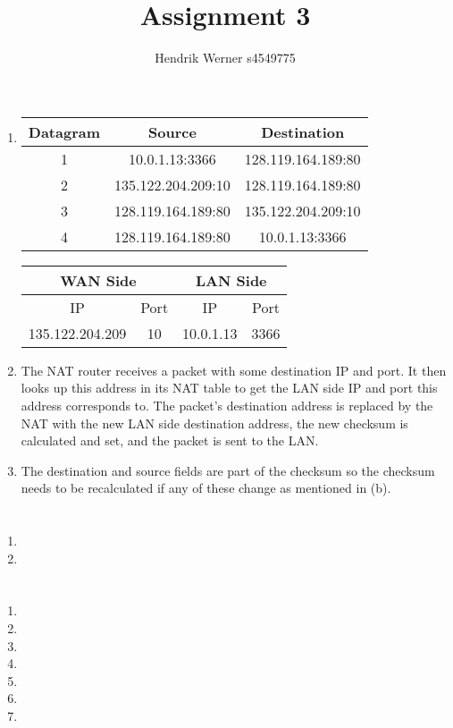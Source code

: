 \documentclass[12pt, a4paper]{article}
\title{Assignment 3}
\author{Hendrik Werner s4549775}
\begin{document}
\maketitle

\section{} %
\begin{enumerate}[a]
	\item %
	\begin{tabular}{|c|c|c|}
		\hline
		Datagram & Source & Destination\\\hline
		1 & 10.0.1.13:3366 & 128.119.164.189:80\\
		2 & 135.122.204.209:10 & 128.119.164.189:80\\
		3 & 128.119.164.189:80 & 135.122.204.209:10\\
		4 & 128.119.164.189:80 & 10.0.1.13:3366\\
		\hline
	\end{tabular}

	\begin{tabular}{|c|c|c|c|}
		\hline
		\multicolumn{2}{|c|}{WAN Side} & \multicolumn{2}{|c|}{LAN Side}\\\hline
		IP & Port & IP & Port\\\hline
		135.122.204.209 & 10 & 10.0.1.13 & 3366\\
		\hline
	\end{tabular}

	\item %
	The NAT router receives a packet with some destination IP and port. It then looks up this address in its NAT table to get the LAN side IP and port this address corresponds to. The packet's destination address is replaced by the NAT with the new LAN side destination address, the new checksum is calculated and set, and the packet is sent to the LAN.

	\item %
	The destination and source fields are part of the checksum so the checksum needs to be recalculated if any of these change as mentioned in (b).

\end{enumerate}

\section{} %
\begin{enumerate}[a]
	\item %
	\item %
\end{enumerate}

\section{} %
\begin{enumerate}[1]
	\item %
	\item %
	\item %
	\item %
	\item %
	\item %
	\item %
\end{enumerate}
\end{document}
